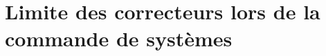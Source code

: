 \section{Limite des correcteurs lors de la commande de systèmes}

\begin{thebibliography}{2}
\end{thebibliography}





